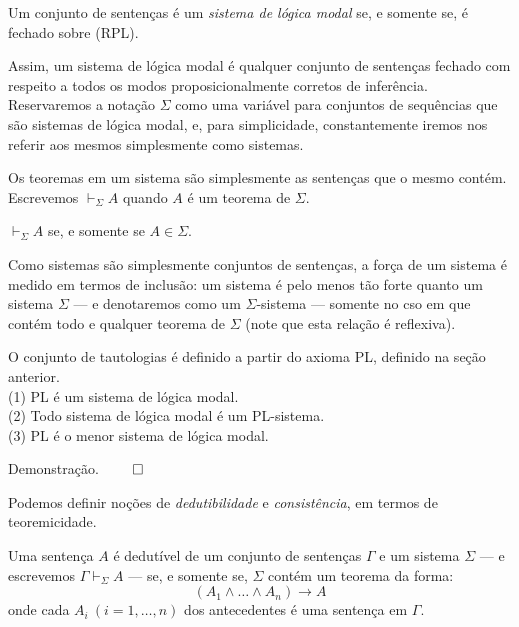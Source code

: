 \begin{definition}
   Um conjunto de sentenças é um \textit{sistema de lógica modal} se, e somente
   se, é fechado sobre (RPL).
\end{definition}

Assim, um sistema de lógica modal é qualquer conjunto de sentenças fechado com
respeito a todos os modos proposicionalmente corretos de inferência.
Reservaremos a notação $\Sigma$ como uma variável para conjuntos de sequências
que são sistemas de lógica modal, e, para simplicidade, constantemente iremos
nos referir aos mesmos simplesmente como sistemas.

Os teoremas em um sistema são simplesmente as sentenças que o mesmo contém.
Escrevemos $\vdash_{\Sigma} A$ quando $A$ é um teorema de $\Sigma$.

\begin{definition}
    $\vdash_{\Sigma} A$ se, e somente se $A \in \Sigma$.
\end{definition}

Como sistemas são simplesmente conjuntos de sentenças, a força de um sistema é medido em
termos de inclusão: um sistema é pelo menos tão forte quanto um sistema $\Sigma$
--- e denotaremos como um $\Sigma$-sistema --- somente no cso em que contém todo
e qualquer teorema de $\Sigma$ (note que esta relação é reflexiva).

\begin{theorem}
    O conjunto de tautologias é definido a partir do axioma PL, definido na
    seção anterior.\\
    (1) PL é um sistema de lógica modal. \\
    (2) Todo sistema de lógica modal é um PL-sistema. \\
    (3) PL é o menor sistema de lógica modal.
\end{theorem}
Demonstração. $\qed$

Podemos definir noções de \textit{dedutibilidade} e \textit{consistência}, em
termos de teoremicidade. 

Uma sentença $A$ é dedutível de um conjunto de
sentenças $\Gamma$ e um sistema $\Sigma$ --- e escrevemos $\Gamma
\vdash_{\Sigma} A$ --- se, e somente se, $\Sigma$ contém um teorema da forma:
\begin{equation}
    (A_1 \wedge \ldots \wedge A_n) \rightarrow A
\end{equation}
onde cada $A_i~(i=1,\ldots,n)$ dos antecedentes é uma sentença em $\Gamma$.

